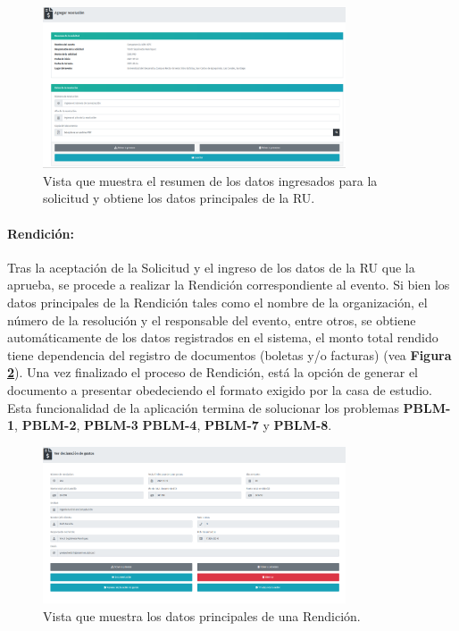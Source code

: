 \begin{figure}[htbp]
    \centering
    \includegraphics[width= 0.8\textwidth]{Imagenes/Resolucion.PNG}
    \caption{\label{fig: Resolucion}Vista que muestra el resumen de los datos ingresados para la solicitud y obtiene los datos principales de la RU.}
\end{figure}

\paragraph{Rendición: } Tras la aceptación de la Solicitud y el ingreso de los datos de la RU que la aprueba, se procede a realizar la Rendición correspondiente al evento. Si bien los datos principales de la Rendición tales como el nombre de la organización, el número de la resolución y el responsable del evento, entre otros, se obtiene automáticamente de los datos registrados en el sistema, el monto total rendido tiene dependencia del registro de documentos (boletas y/o facturas) (vea \textbf{Figura \ref{fig: Rendicion}}). Una vez finalizado el proceso de Rendición, está la opción de generar el documento a presentar obedeciendo el formato exigido por la casa de estudio. Esta funcionalidad de la aplicación termina de solucionar los problemas \textbf{PBLM-1}, \textbf{PBLM-2}, \textbf{PBLM-3} \textbf{PBLM-4}, \textbf{PBLM-7} y \textbf{PBLM-8}.

\begin{figure}[htbp]
    \centering
    \includegraphics[width= 0.8\textwidth]{Imagenes/Rendicion2.png}
    \caption{\label{fig: Rendicion}Vista que muestra los datos principales de una Rendición.}
\end{figure}

